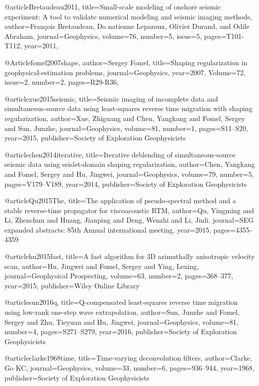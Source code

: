 @article{Bretaudeau2011,
  title={Small-scale modeling of onshore seismic experiment: A tool to validate numerical modeling and seismic imaging methods},
  author={François Bretaudeau, Do natienne Leparoux, Olivier Durand, and Odile Abraham},
  journal={Geophysics},
  volume={76},
  number={5},
  issue=5,
  pages={T101-T112},
  year={2011},
}

@Article{fomel2007shape,
  author={Sergey Fomel},
  title={Shaping regularization in geophysical-estimation problems},
  journal={Geophysics},
  year=2007,
  Volume=72,
  issue=2,
  number=2,
  pages={R29-R36},
}

@article{xue2015seismic,
  title={Seismic imaging of incomplete data and simultaneous-source data using least-squares reverse time migration with shaping regularization},
  author={Xue, Zhiguang and Chen, Yangkang and Fomel, Sergey and Sun, Junzhe},
  journal={Geophysics},
  volume={81},
  number={1},
  pages={S11--S20},
  year={2015},
  publisher={Society of Exploration Geophysicists}
}

@article{chen2014iterative,
  title={Iterative deblending of simultaneous-source seismic data using seislet-domain shaping regularization},
  author={Chen, Yangkang and Fomel, Sergey and Hu, Jingwei},
  journal={Geophysics},
  volume={79},
  number={5},
  pages={V179--V189},
  year={2014},
  publisher={Society of Exploration Geophysicists}
}

@article{Qu2015The,
  title={The application of pseudo-spectral method and a stable reverse-time propagator for viscoacoustic {RTM}},
  author={Qu, Yingming and Li, Zhenchun and Huang, Jianping and Deng, Wenzhi and Li, Jinli},
  journal={SEG expanded abstracts: 85th Annual international meeting},
  year={2015},
  pages={4355-4359}
}

@article{hu2015fast,
  title={A fast algorithm for 3{D} azimuthally anisotropic velocity scan},
  author={Hu, Jingwei and Fomel, Sergey and Ying, Lexing},
  journal={Geophysical Prospecting},
  volume={63},
  number={2},
  pages={368--377},
  year={2015},
  publisher={Wiley Online Library}
}

@article{sun2016q,
  title={Q-compensated least-squares reverse time migration using low-rank one-step wave extrapolation},
  author={Sun, Junzhe and Fomel, Sergey and Zhu, Tieyuan and Hu, Jingwei},
  journal={Geophysics},
  volume={81},
  number={4},
  pages={S271--S279},
  year={2016},
  publisher={Society of Exploration Geophysicists}
}

@article{clarke1968time,
  title={Time-varying deconvolution filters},
  author={Clarke, Go KC},
  journal={Geophysics},
  volume={33},
  number={6},
  pages={936--944},
  year={1968},
  publisher={Society of Exploration Geophysicists}
}

